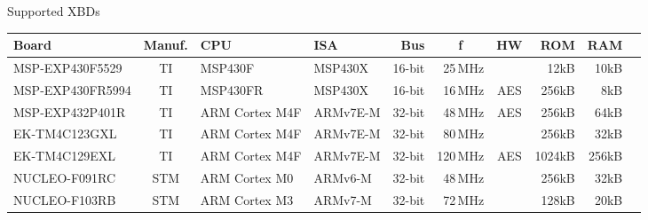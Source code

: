 \documentclass[xcolor=pdftex,dvipsnames,table,final]{beamer}
\newcommand{\thb}[1]{\multicolumn{1}{c}{\textbf{#1}}}
\begin{document}
\begin{frame}[fragile]{}
\begin{columns}[t, totalwidth=\textwidth]
\begin{column}{.675\linewidth}
   \begin{columns}%
   \begin{column}{0.977\linewidth}
      \begin{block}{Supported XBDs}
        \begin{minipage}{0.83\linewidth}
          \centering\renewcommand\tabcolsep{10pt}%
    \begin{tabular}{l|c|ll|rrc|rr|r}
    \textbf{Board}   & \textbf{Manuf.}&\textbf{CPU}&\textbf{ISA}&\textbf{Bus}&\thb{f}&\textbf{HW}&\textbf{ROM}&\textbf{RAM} \\ \hline
    MSP-EXP430F5529  & TI        & MSP430F        &  MSP430X    & 16-bit &  25\,MHz &     &   12kB &  10kB  \\
    MSP-EXP430FR5994 & TI        & MSP430FR       &  MSP430X    & 16-bit &  16\,MHz & AES &  256kB &   8kB  \\
    MSP-EXP432P401R  & TI        & ARM Cortex M4F &  ARMv7E-M   & 32-bit &  48\,MHz & AES &  256kB &  64kB  \\
    EK-TM4C123GXL    & TI        & ARM Cortex M4F &  ARMv7E-M   & 32-bit &  80\,MHz &     &  256kB &  32kB  \\ 
    EK-TM4C129EXL    & TI        & ARM Cortex M4F &  ARMv7E-M   & 32-bit & 120\,MHz & AES & 1024kB & 256kB  \\ 
    NUCLEO-F091RC    & STM       & ARM Cortex M0  &  ARMv6-M    & 32-bit &  48\,MHz &     &  256kB &  32kB  \\
    NUCLEO-F103RB    & STM       & ARM Cortex M3  &  ARMv7-M    & 32-bit &  72\,MHz &     &  128kB &  20kB  \\
    \end{tabular}
        \end{minipage}
        \begin{minipage}{0.15\linewidth}

\end{minipage}
\end{block}
\end{column}
\end{columns}
\end{column}
\end{columns}
\end{frame}
\end{document}
